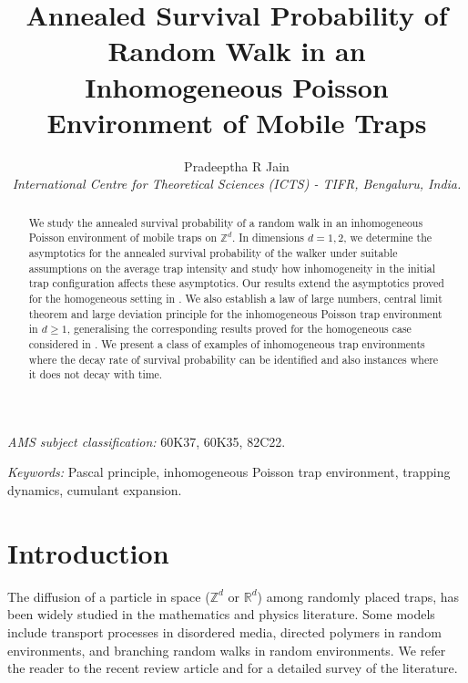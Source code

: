 \documentclass{article}[12pt]
\theoremstyle{definition}
\newcommand{\R}{\mathbb{R}}
\newcommand{\Z}{\mathbb{Z}}
\newcommand{\1}{\mathbbm{1}}
\begin{document}
\title{Annealed Survival Probability of Random Walk in an Inhomogeneous Poisson Environment of Mobile Traps}
\date{}

\author{Pradeeptha R Jain \\
  {\small \it International Centre for Theoretical Sciences (ICTS) - TIFR, Bengaluru, India.}}

\maketitle

\begin{abstract}
     We study the annealed survival probability of a random walk in an inhomogeneous Poisson environment of mobile traps on $\mathbb{Z}^d$. In dimensions $d=1,2$, we determine the asymptotics for the annealed survival probability of the walker under suitable  assumptions on the average trap intensity and study how inhomogeneity in the initial trap configuration affects these asymptotics. Our results extend the asymptotics proved for the homogeneous setting in \cite{DGRS2012}. We also establish a law of large numbers, central limit theorem and large deviation principle for the inhomogeneous Poisson trap environment in $d\ge 1$, generalising the corresponding results proved for the homogeneous case considered in \cite{CG1984}. We present a class of examples of inhomogeneous trap environments where the decay rate of survival probability can be identified and also instances where it does not decay with time.
\end{abstract}

\textit{AMS subject classification:} 60K37, 60K35, 82C22.

\textit{Keywords:} Pascal principle, inhomogeneous Poisson trap environment, trapping dynamics, cumulant expansion.

\section{Introduction}

The diffusion of a particle in space ($\Z^d$ or $\R^d$) among randomly placed traps, has been widely studied in the mathematics and physics literature. Some models include transport processes in disordered media, directed polymers in random environments, and branching random walks in random environments. 
We refer the reader to the recent review article \cite{ADS2019} and \cite{DGRS2012} for a detailed survey of the literature. 
\end{document}
